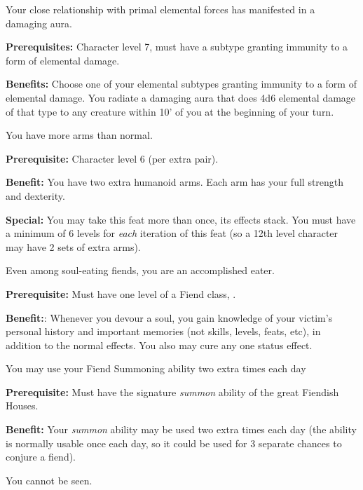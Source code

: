 
Your close relationship with primal elemental forces has manifested in a damaging aura.

\textbf{Prerequisites:} Character level 7, must have a subtype granting immunity to a form of elemental damage.

\textbf{Benefits:} Choose one of your elemental subtypes granting immunity to a form of elemental damage. You radiate a damaging aura that does 4d6 elemental damage of that type to any creature within 10' of you at the beginning of your turn.


You have more arms than normal.

\textbf{Prerequisite:} Character level 6 (per extra pair).

\textbf{Benefit:} You have two extra humanoid arms. Each arm has your full strength and dexterity.

\textbf{Special:} You may take this feat more than once, its effects stack. You must have a minimum of 6 levels for \textit{each} iteration of this feat (so a 12th level character may have 2 sets of extra arms).


Even among soul-eating fiends, you are an accomplished eater.

\textbf{Prerequisite:} Must have one level of a Fiend class, .

\textbf{Benefit:}: Whenever you devour a soul, you gain knowledge of your victim's personal history and important memories (not skills, levels, feats, etc), in addition to the normal effects. You also may cure any one status effect.


You may use your Fiend Summoning ability two extra times each day

\textbf{Prerequisite:} Must have the signature \textit{summon} ability of the great Fiendish Houses.

\textbf{Benefit:} Your \textit{summon} ability may be used two extra times each day (the ability is normally usable once each day, so it could be used for 3 separate chances to conjure a fiend).


You cannot be seen.

